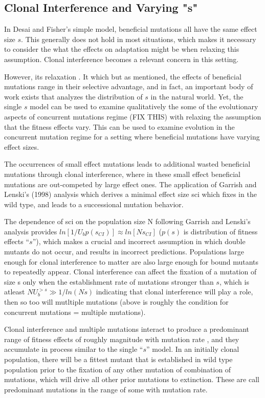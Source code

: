\documentclass[12pt]{article}
\begin{document}
\subsection*{Clonal Interference and Varying "s"}
In Desai and Fisher's simple model, beneficial mutations all have the same effect size $s$.  This generally does not hold in most situations, which makes it necessary to consider the what the effects on adaptation might be when relaxing this assumption.  Clonal interference becomes a relevant concern in this setting.

However, its relaxation .  It which but as mentioned, the effects of beneficial mutations range in their selective advantage, and in fact, an important body of work exists that analyzes the distribution of $s$ in the natural world.  Yet, the single $s$ model can be used to examine qualitatively the some of the evolutionary aspects of concurrent mutations regime (FIX THIS) with relaxing the assumption that the fitness effects vary.  This can be used to examine evolution in the concurrent mutation regime for a setting where beneficial mutations have varying effect sizes.

The occurrences of small effect mutations leads to additional wasted beneficial mutations through clonal interference, where in these small effect beneficial mutations are out-competed by large effect ones.  The application of Garrish and Lenski's (1998) analysis which derives a minimal effect size sci which fixes in the wild type, and leads to a successional mutation behavior.

The dependence of sci on the population size N following Garrish and Lenski's analysis provides $ln[1/U_b p(s_{CI})]\approx ln[Ns_{CI}]$ ($p(s)$ is distribution of fitness effects “$s$”), which makes a crucial and incorrect assumption in which double mutants do not occur, and results in incorrect predictions. Populations large enough for clonal interference to matter are also large enough for bound mutants to repeatedly appear.  Clonal interference can affect the fixation of a mutation of size s only when the establishment rate of  mutations stronger than $s$, which is atleast $NU_b^{>s} \gg 1/ln(Ns)$ indicating that clonal interference will play a role, then so too will mutltiple mutations (above is roughly the condition for concurrent mutations = multiple mutations). 

Clonal interference and multiple mutations interact to produce a predominant range of fitness effects of roughly magnitude with mutation rate , and they accumulate in process similar to the single “$s$” model.
In an initially clonal population, there will be a fittest mutant that is established in wild type population prior to the fixation of any other mutation of combination of mutations, which will drive all other prior mutations to extinction.  These are call predominant mutations in the range of some with mutation rate.
\end{document}
